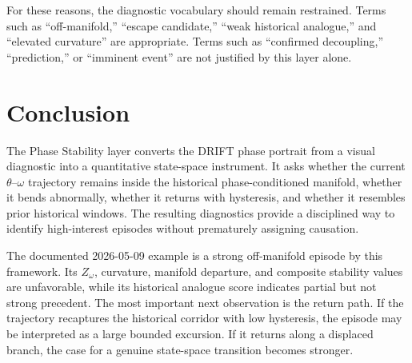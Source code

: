 \documentclass[11pt]{article}
\begin{document}
For these reasons, the diagnostic vocabulary should remain restrained. Terms such as ``off-manifold,'' ``escape candidate,'' ``weak historical analogue,'' and ``elevated curvature'' are appropriate. Terms such as ``confirmed decoupling,'' ``prediction,'' or ``imminent event'' are not justified by this layer alone.

\section{Conclusion}

The Phase Stability layer converts the DRIFT phase portrait from a visual diagnostic into a quantitative state-space instrument. It asks whether the current \(\theta\)--\(\omega\) trajectory remains inside the historical phase-conditioned manifold, whether it bends abnormally, whether it returns with hysteresis, and whether it resembles prior historical windows. The resulting diagnostics provide a disciplined way to identify high-interest episodes without prematurely assigning causation.

The documented 2026-05-09 example is a strong off-manifold episode by this framework. Its \(Z_{\omega}\), curvature, manifold departure, and composite stability values are unfavorable, while its historical analogue score indicates partial but not strong precedent. The most important next observation is the return path. If the trajectory recaptures the historical corridor with low hysteresis, the episode may be interpreted as a large bounded excursion. If it returns along a displaced branch, the case for a genuine state-space transition becomes stronger.
\end{document}
